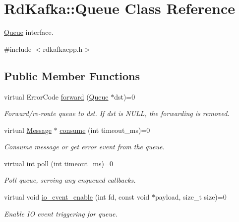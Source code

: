 \hypertarget{classRdKafka_1_1Queue}{
\section{RdKafka::Queue Class Reference}
\label{classRdKafka_1_1Queue}
}


\hyperlink{classRdKafka_1_1Queue}{Queue} interface.  


{\ttfamily \#include $<$rdkafkacpp.h$>$}\subsection*{Public Member Functions}
\begin{DoxyCompactItemize}
\item 
virtual ErrorCode \hyperlink{classRdKafka_1_1Queue_a49827afcb8804719ffc23d120915b371}{forward} (\hyperlink{classRdKafka_1_1Queue}{Queue} $\ast$dst)=0
\begin{DoxyCompactList}\small\item\em Forward/re-\/route queue to {\ttfamily dst}. If {\ttfamily dst} is {\ttfamily NULL}, the forwarding is removed. \item\end{DoxyCompactList}\item 
virtual \hyperlink{classRdKafka_1_1Message}{Message} $\ast$ \hyperlink{classRdKafka_1_1Queue_aa8a0ff1e3df108e8bb6c9ef611f5eef4}{consume} (int timeout\_\-ms)=0
\begin{DoxyCompactList}\small\item\em Consume message or get error event from the queue. \item\end{DoxyCompactList}\item 
virtual int \hyperlink{classRdKafka_1_1Queue_a4d37e2fdf4579876f4ae3f315bc2e74d}{poll} (int timeout\_\-ms)=0
\begin{DoxyCompactList}\small\item\em Poll queue, serving any enqueued callbacks. \item\end{DoxyCompactList}\item 
virtual void \hyperlink{classRdKafka_1_1Queue_a91ec180ff3b7f3a97be7b7e30163625c}{io\_\-event\_\-enable} (int fd, const void $\ast$payload, size\_\-t size)=0
\begin{DoxyCompactList}\small\item\em Enable IO event triggering for queue. \item\end{DoxyCompactList}\end{DoxyCompactItemize}
